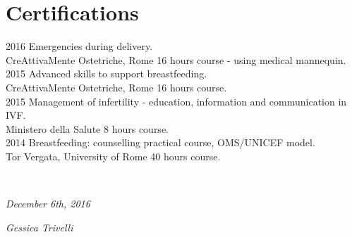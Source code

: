 \documentclass[]{friggeri-cv}
\begin{document}
\section{Certifications}
\begin{entrylist}
  \entry
	  {2016}
	  {Emergencies during delivery.}
	  {\\CreAttivaMente Ostetriche, Rome}
	  {16 hours course - using medical mannequin.\\}
  \entry
	  {2015}
	  {Advanced skills to support breastfeeding.}
	  {\\CreAttivaMente Ostetriche, Rome}
	  {16 hours course.\\}
  \entry
	  {2015}
	  {Management of infertility - education, information and communication in IVF.}
	  {\\Ministero della Salute}
	  {8 hours course.\\}
  \entry
  {2014}
  {Breastfeeding: counselling practical course, OMS/UNICEF model.}
  {\\Tor Vergata, University of Rome}
  {40 hours course.\\}
\end{entrylist}
\\
\begin{flushleft}
\emph{December 6th, 2016}
\end{flushleft}
\begin{flushright}
\emph{Gessica Trivelli}
\end{flushright}
\end{document}
